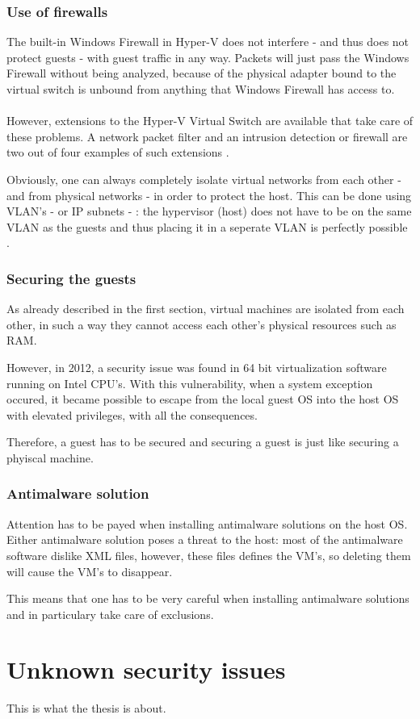 \subsubsection{Use of firewalls}

The built-in Windows Firewall in Hyper-V does not interfere - and thus does not protect guests - with guest traffic in any way. Packets will just pass the Windows Firewall without being analyzed, because of the physical adapter bound to the virtual switch is unbound from anything that Windows Firewall has access to. \\ \\
However, extensions to the Hyper-V Virtual Switch are available that take care of these problems. A network packet filter and an intrusion detection or firewall are two out of four examples of such extensions \citep{Firewall1}.

Obviously, one can always completely isolate virtual networks from each other - and from physical networks - in order to protect the host. This can be done using VLAN's - or IP subnets - : the hypervisor (host) does not have to be on the same VLAN as the guests and thus placing it in a seperate VLAN is perfectly possible \citep{Firewall2}.


\subsubsection{Securing the guests}

As already described in the first section, virtual machines are isolated from each other, in such a way they cannot access each other's physical resources such as RAM.

However, in 2012, a security issue was found in 64 bit virtualization software running on Intel CPU's. With this vulnerability, when a system exception occured, it became possible to escape from the local guest OS into the host OS with elevated privileges, with all the consequences.

Therefore, a guest has to be secured and securing a guest is just like securing a phyiscal machine.

\subsubsection{Antimalware solution}

Attention has to be payed when installing antimalware solutions on the host OS. Either antimalware solution poses a threat to the host: most of the antimalware software dislike XML files, however, these files defines the VM's, so deleting them will cause the VM's to disappear.

This means that one has to be very careful when installing antimalware solutions and in particulary take care of exclusions.

\section{Unknown security issues}
This is what the thesis is about.